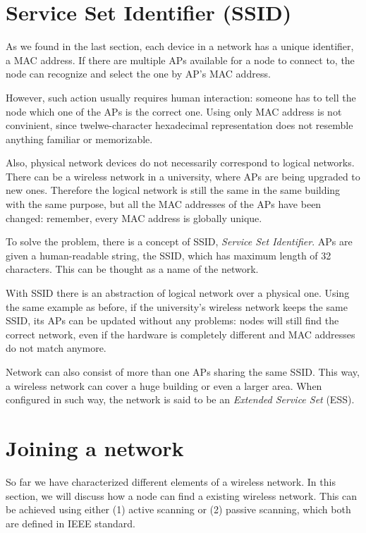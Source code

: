 \documentclass[12pt,a4paper,oneside,pdftex]{report}
\begin{document}
\section{Service Set Identifier (SSID)}
\label{sec:SSID}

As we found in the last section, each device in a network has a unique identifier, a MAC address. If there are multiple APs available for a node to connect to, the node can recognize and select the one by AP's MAC address.

However, such action usually requires human interaction: someone has to tell the node which one of the APs is the correct one. Using only MAC address is not convinient, since twelwe-character hexadecimal representation does not resemble anything familiar or memorizable.

Also, physical network devices do not necessarily correspond to logical networks. There can be a wireless network in a university, where APs are being upgraded to new ones. Therefore the logical network is still the same in the same building with the same purpose, but all the MAC addresses of the APs have been changed: remember, every MAC address is globally unique.

To solve the problem, there is a concept of SSID, \emph{Service Set Identifier}. APs are given a human-readable string, the SSID, which has maximum length of 32 characters. This can be thought as a name of the network.

With SSID there is an abstraction of logical network over a physical one. Using the same example as before, if the university's wireless network keeps the same SSID, its APs can be updated without any problems: nodes will still find the correct network, even if the hardware is completely different and MAC addresses do not match anymore.

Network can also consist of more than one APs sharing the same SSID. This way, a wireless network can cover a huge building or even a larger area. When configured in such way, the network is said to be an \emph{Extended Service Set} (ESS).~\cite{IEEE802.11}


\section{Joining a network}
\label{sec:joining}

So far we have characterized different elements of a wireless network. In this section, we will discuss how a node can find a existing wireless network. This can be achieved using either (1) active scanning or (2) passive scanning, which both are defined in IEEE standard.~\cite{IEEE802.11_scanning}
\end{document}
